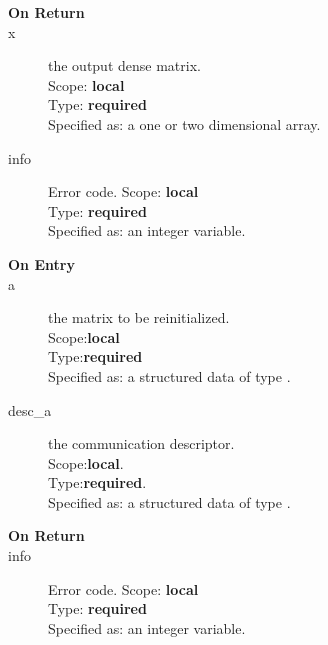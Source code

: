 \begin{description}
\item[\bf On Return]
\item[x] the output dense matrix.\\
Scope: {\bf local} \\
Type: {\bf required}\\
Specified as: a one or two dimensional array.\\
\item[info] Error code.
Scope: {\bf local} \\
Type: {\bf required}\\
Specified as: an integer variable.
\end{description}



%
%


\begin{description}
\item[\bf On Entry]
\item[a] the matrix to be reinitialized.\\
Scope:{\bf local}\\
Type:{\bf required}\\
Specified as: a structured data of type \spdata.
\item[desc\_a] the communication descriptor.\\
Scope:{\bf local}.\\
Type:{\bf required}.\\
Specified as: a structured data of type \descdata.
\end{description}

\begin{description}
\item[\bf On Return]
\item[info] Error code.
Scope: {\bf local} \\
Type: {\bf required}\\
Specified as: an integer variable.
\end{description}

%
%



